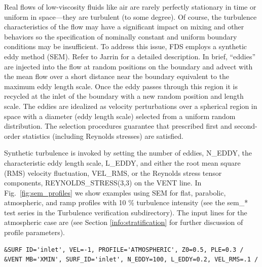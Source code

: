 \documentclass[11pt]{book}
\begin{document}
Real flows of low-viscosity fluids like air are rarely perfectly stationary in time or uniform in space---they are turbulent (to some degree). Of course, the turbulence characteristics of the flow may have a significant impact on mixing and other behaviors so the specification of nominally constant and uniform boundary conditions may be insufficient.  To address this issue, FDS employs a synthetic eddy method (SEM).  Refer to Jarrin \cite{Jarrin:2008} for a detailed description. In brief, ``eddies'' are injected into the flow at random positions on the boundary and advect with the mean flow over a short distance near the boundary equivalent to the maximum eddy length scale.  Once the eddy passes through this region it is recycled at the inlet of the boundary with a new random position and length scale. The eddies are idealized as velocity perturbations over a spherical region in space with a diameter (eddy length scale) selected from a uniform random distribution. The selection procedures guarantee that prescribed first and second-order statistics (including Reynolds stresses) are satisfied.

Synthetic turbulence is invoked by setting the number of eddies, {\ct N\_EDDY}, the characteristic eddy length scale, {\ct L\_EDDY}, and either the root mean square (RMS)
velocity fluctuation, {\ct VEL\_RMS}, or the Reynolds stress tensor components, {\ct REYNOLDS\_STRESS(3,3)} on the {\ct VENT} line.  In Fig.~\ref{fig:sem_profiles} we show examples using SEM for flat, parabolic, atmospheric, and ramp profiles with 10 \% turbulence intensity (see the {\ct sem\_*} test series in the Turbulence verification subdirectory).  The input lines for the atmospheric case are (see Section \ref{info:stratification} for further discussion of profile parameters).

\begin{lstlisting}
&SURF ID='inlet', VEL=-1, PROFILE='ATMOSPHERIC', Z0=0.5, PLE=0.3 /
&VENT MB='XMIN', SURF_ID='inlet', N_EDDY=100, L_EDDY=0.2, VEL_RMS=.1 /
\end{lstlisting}
\end{document}
